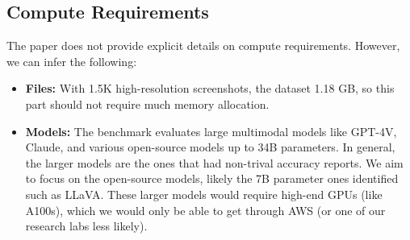 \documentclass[11pt,a4paper]{article}
\begin{document}
    
    

\subsection{Compute Requirements}



The paper does not provide explicit details on compute requirements. However, we can infer the following:
\begin{itemize}
    \item \textbf{Files:} With 1.5K high-resolution screenshots, the dataset 1.18 GB, so this part should not require much memory allocation.
    \item \textbf{Models:} The benchmark evaluates large multimodal models like GPT-4V, Claude, and various open-source models up to 34B parameters. In general, the larger models are the ones that had non-trival accuracy reports. We aim to focus on the open-source models, likely the 7B parameter ones identified such as LLaVA. These larger models would require high-end GPUs (like A100s), which we would only be able to get through AWS (or one of our research labs less likely).
\end{itemize}
\end{document}
